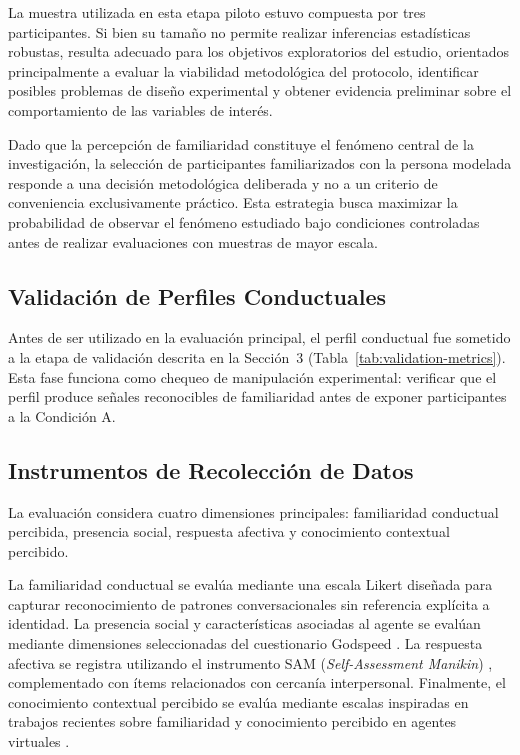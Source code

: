\documentclass[sigconf, nonacm, language=spanish]{acmart}
\begin{document}
La muestra utilizada en esta etapa piloto estuvo compuesta por tres participantes. Si bien su tamaño no permite realizar inferencias estadísticas robustas, resulta adecuado para los objetivos exploratorios del estudio, orientados principalmente a evaluar la viabilidad metodológica del protocolo, identificar posibles problemas de diseño experimental y obtener evidencia preliminar sobre el comportamiento de las variables de interés.

Dado que la percepción de familiaridad constituye el fenómeno central de la investigación, la selección de participantes familiarizados con la persona modelada responde a una decisión metodológica deliberada y no a un criterio de conveniencia exclusivamente práctico. Esta estrategia busca maximizar la probabilidad de observar el fenómeno estudiado bajo condiciones controladas antes de realizar evaluaciones con muestras de mayor escala.


\subsection{Validación de Perfiles Conductuales}

Antes de ser utilizado en la evaluación principal, el perfil conductual fue sometido a la etapa de validación descrita en la Sección~3 (Tabla~\ref{tab:validation-metrics}). Esta fase funciona como chequeo de manipulación experimental: verificar que el perfil produce señales reconocibles de familiaridad antes de exponer participantes a la Condición A.

\subsection{Instrumentos de Recolección de Datos}

La evaluación considera cuatro dimensiones principales: familiaridad conductual percibida, presencia social, respuesta afectiva y conocimiento contextual percibido.

La familiaridad conductual se evalúa mediante una escala Likert diseñada para capturar reconocimiento de patrones conversacionales sin referencia explícita a identidad. La presencia social y características asociadas al agente se evalúan mediante dimensiones seleccionadas del cuestionario Godspeed \cite{bartneck_measurement_2009}. La respuesta afectiva se registra utilizando el instrumento SAM (\textit{Self-Assessment Manikin}) \cite{bradley_measures_1994}, complementado con ítems relacionados con cercanía interpersonal. Finalmente, el conocimiento contextual percibido se evalúa mediante escalas inspiradas en trabajos recientes sobre familiaridad y conocimiento percibido en agentes virtuales \cite{poletaykina_knowing_2025, yang_exploring_2025}.
\end{document}
